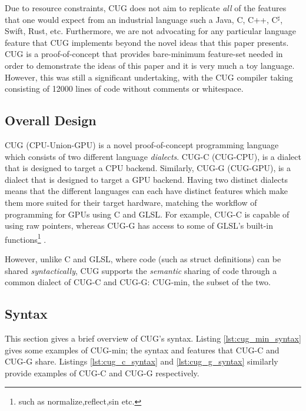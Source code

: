 \documentclass[a4paper,12pt,twoside,openright]{report}
\def\compilerloccount{12000 }
\begin{document}
Due to resource constraints, CUG does not aim to replicate \textit{all} of the
features that one would expect from an industrial language such a Java, C, C++,
C$^\sharp$, Swift, Rust, etc. Furthermore, we are not advocating for any
particular language feature that CUG implements beyond the novel ideas that
this paper presents. CUG is a proof-of-concept that provides bare-minimum
feature-set needed in order to demonstrate the ideas of this paper and it is
very much a toy language. However, this was still a significant undertaking,
with the CUG compiler taking consisting of \compilerloccount lines of code
without comments or whitespace.

\subsection{Overall Design}

CUG (CPU-Union-GPU) is a novel proof-of-concept programming language which
consists of two different language \textit{dialects}. CUG-C (CUG-CPU), is a
dialect that is designed to target a CPU backend. Similarly, CUG-G (CUG-GPU),
is a dialect that is designed to target a GPU backend. Having two distinct
dialects means that the different languages can each have distinct features
which make them more suited for their target hardware, matching the workflow of
programming for GPUs using C and GLSL. For example, CUG-C is capable of using
raw pointers, whereas CUG-G has access to some of GLSL's built-in
functions\footnote{such as normalize,reflect,sin etc.} \cite{GLSLBuiltIn}.

However, unlike C and GLSL, where code (such as struct definitions) can be
shared \textit{syntactically}, CUG supports the \textit{semantic} sharing of
code through a common dialect of CUG-C and CUG-G: CUG-min, the subset of the
two.

\subsection{Syntax}

\label{sec:language_syntax}

This section gives a brief overview of CUG's syntax. Listing
\ref{lst:cug_min_syntax} gives some examples of CUG-min; the syntax and
features that CUG-C and CUG-G share. Listings \ref{lst:cug_c_syntax} and
\ref{lst:cug_g_syntax} similarly provide examples of CUG-C and CUG-G
respectively.
\end{document}
